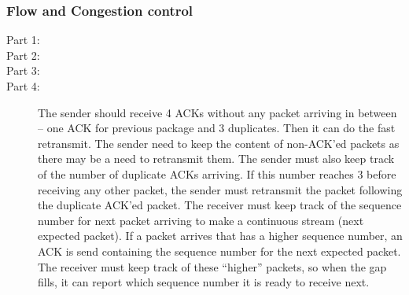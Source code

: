 \subsubsection{Flow and Congestion control}
\begin{description}
    \item[Part 1:]
    \item[Part 2:]
    \item[Part 3:] %
    \item[Part 4:]
    The sender should receive 4 ACKs without any packet arriving in between
    -- one ACK for previous package and 3 duplicates. Then it can do the fast
    retransmit.
    The sender need to keep the content of non-ACK'ed packets as there may be a need to retransmit them.
    The sender must also keep track of the number of duplicate ACKs arriving. If this number reaches 3 before receiving any other packet, the sender must retransmit the packet following the duplicate ACK'ed packet.
    The receiver must keep track of the sequence number for next packet arriving to make a continuous stream (next expected packet). If a packet arrives that has a higher sequence number, an ACK is send containing the sequence number for the next expected packet. The receiver must keep track of these ``higher'' packets, so when the gap fills, it can report which sequence number it is ready to receive next.

\end{description}
